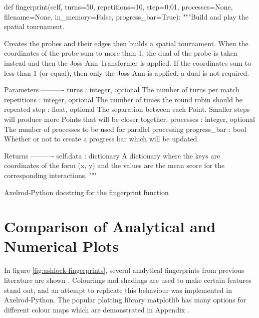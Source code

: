 \begin{listing}[hbtp!]
\begin{SourceCode}
def fingerprint(self, turns=50, repetitions=10, step=0.01, processes=None,
                filename=None, in_memory=False, progress_bar=True):
    """Build and play the spatial tournament.

    Creates the probes and their edges then builds a spatial tournament.
    When the coordinates of the probe sum to more than 1, the dual of the
    probe is taken instead and then the Joss-Ann Transformer is applied. If
    the coordinates sum to less than 1 (or equal), then only the Joss-Ann is
    applied, a dual is not required.

    Parameters
    ----------
    turns : integer, optional
        The number of turns per match
    repetitions : integer, optional
        The number of times the round robin should be repeated
    step : float, optional
        The separation between each Point. Smaller steps will
        produce more Points that will be closer together.
    processes : integer, optional
        The number of processes to be used for parallel processing
    progress_bar : bool
        Whether or not to create a progress bar which will be updated

    Returns
    ----------
    self.data : dictionary
        A dictionary where the keys are coordinates of the form (x, y) and
        the values are the mean score for the corresponding interactions.
    """
\end{SourceCode}
\caption{Axelrod-Python docstring for the fingerprint function}
\label{lst:fingerprint-docstring}
\end{listing}


\section{Comparison of Analytical and Numerical Plots}

In figure \ref{fig:ashlock-fingerprints}, several analytical fingerprints from previous literature are shown \cite{Ashlock2004}.
Colourings and shadings are used to make certain features stand out, and an attempt to replicate this behaviour was implemented in Axelrod-Python.
The popular plotting library matplotlib has many options for different colour maps which are demonstrated in Appendix . %

